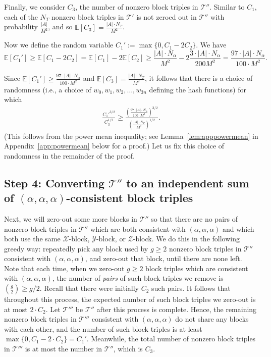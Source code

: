 \documentclass{theoretics}
\newcommand{\E}{\mathbb{E}}
\newcommand{\T}{\mathcal{T}}
\newcommand{\X}{\mathcal{X}}
\newcommand{\Y}{\mathcal{Y}}
\newcommand{\Z}{\mathcal{Z}}
\begin{document}
Finally, we consider $C_3$, the number of nonzero block triples in $\T''$. Similar to $C_1$, each of the $N_T$ nonzero block triples in $\T'$ is not zeroed out in $\T''$ with probability $\frac{|A|}{M^2}$, and so $\E[C_3] = \frac{|A| \cdot N_T}{M^2}$.



Now we define the random variable $C_1' := \max\{ 0, C_1 - 2 C_2 \}$. We have $$\E[C_1'] \geq \E[C_1 - 2 C_2] = \E[C_1] - 2 \E[C_2] \geq \frac{|A| \cdot N_\alpha}{M^2} - 2 \frac{3 \cdot |A| \cdot N_\alpha}{200 M^2} = \frac{97 \cdot |A| \cdot N_\alpha}{100 \cdot M^2}.$$

Since $\E[C_1'] \geq \frac{97 \cdot |A| \cdot N_\alpha}{100 \cdot M^2}$ and $\E[C_3] = \frac{|A| \cdot N_T}{M^2}$, it follows that there is a choice of randomness (i.e., a choice of $w_0, w_1, w_2, \ldots, w_{3n}$ defining the hash functions) for which \begin{align} \frac{C_1'^{3/2}}{C_3^{1/2}} \geq \frac{\left(\frac{97 \cdot |A| \cdot N_\alpha}{100 \cdot M^2} \right)^{3/2}}{\left( \frac{|A| \cdot N_T}{M^2} \right)^{1/2}}. \end{align} (This follows from the power mean inequality; see Lemma~\ref{lem:apppowermean} in Appendix~\ref{app:powermean} below for a proof.) Let us fix this choice of randomness in the remainder of the proof.


\subsection{Step 4: Converting \texorpdfstring{$\T''$}{T''} to an independent sum of \texorpdfstring{$(\alpha,\alpha,\alpha)$}{(alpha,alpha,alpha)}-consistent block triples}

Next, we will zero-out some more blocks in $\T''$ so that there are no pairs of nonzero block triples in $\T''$ which are both consistent with $(\alpha,\alpha,\alpha)$ and which both use the same $\X$-block, $\Y$-block, or $\Z$-block. We do this in the following greedy way: repeatedly pick any block used by $g \geq 2$ nonzero block triples in $\T''$ consistent with $(\alpha,\alpha,\alpha)$, and zero-out that block, until there are none left. Note that each time, when we zero-out $g \geq 2$ block triples which are consistent with $(\alpha,\alpha,\alpha)$, the number of \emph{pairs} of such block triples we remove is $\binom{g}{2} \geq g/2$. Recall that there were initially $C_2$ such pairs. It follows that throughout this process, the expected number of such block triples we zero-out is at most $2 \cdot C_2$. Let $\T'''$ be $\T''$ after this process is complete. Hence, the remaining nonzero block triples in $\T'''$ consistent with $(\alpha,\alpha,\alpha)$ do not share any blocks with each other, and the number of such block triples is at least $\max\{0, C_1 - 2 \cdot C_2\} = C_1'$.
Meanwhile, the total number of nonzero block triples in $\T'''$ is at most the number in $\T''$, which is $C_3$. 
\end{document}
